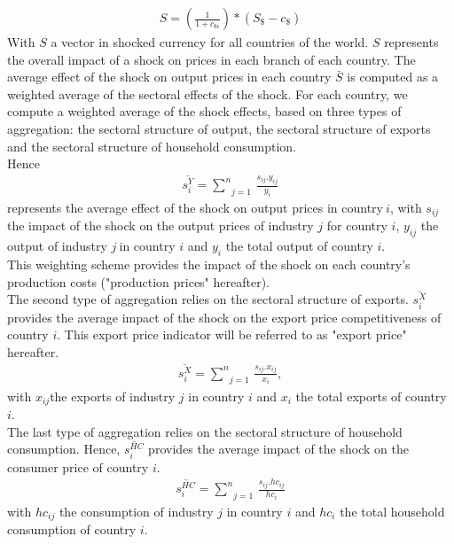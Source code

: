 \documentclass[11pt,a4paper]{article}
\begin{document}
\begin{eqnarray*}
	S=\left( \frac{1}{1+{{c}_{\$i}}}\right)*\left({{S}_{\$}}-{{c}_{\$}}\right)
\end{eqnarray*}
With $S$ a vector in shocked currency for all countries of the world. $S$ represents the overall impact of a shock on prices in each branch of each country. The average effect of the shock on output prices in each country $\bar{S}$ is computed as a weighted average of the sectoral effects of the shock. For each country, we compute a weighted average of the shock effects, based on three types of aggregation: the sectoral structure of output, the sectoral structure of exports and the sectoral structure of household consumption.\\
Hence 
\begin{eqnarray*}
\overline{s_{i}^{Y}}=\underset{j=1}{\overset{n}{\mathop \sum }}\,\frac{{{s}_{ij}}.{{y}_{ij}}}{{{y}_{i}}}
 \end{eqnarray*}
represents the average effect of the shock on output prices in country$~i$, with ${{{s}}_{{ij}}}$ the impact of the shock on the output prices of industry $j$ for country $i$, ${{{y}}_{{ij}}}$ the output of industry $j~$in country $i$ and ${{{y}}_{{i}}}$ the total output of country $i$. \\
This weighting scheme provides the impact of the shock on each country's production costs ("production prices" hereafter).\\
The second type of aggregation relies on the sectoral structure of exports. $\overline{s_{i}^{X}}$ provides the average impact of the shock on the export price competitiveness of country $i$. This export price indicator will be referred to as "export price" hereafter. \\
 \begin{eqnarray*}
\overline{s_{i}^{X}}=\underset{j=1}{\overset{n}{\mathop \sum }}\,\frac{{{s}_{ij}}.{{x}_{ij}}}{{{x}_{i}}},
 \end{eqnarray*} 
with $x_{ij}$the exports of industry $j$ in country $i$ and $x_{i}$ the total exports of country $i$. \\
The last type of aggregation relies on the sectoral structure of household consumption. Hence, $\overline{s_{i}^{HC}}$ provides the average impact of the shock on the consumer price of country $i$. 
 \begin{eqnarray}
\overline{s_{i}^{HC}}=\underset{j=1}{\overset{n}{\mathop \sum }}\,\frac{{{s}_{ij}}.h{{c}_{ij}}}{h{{c}_{i}}}
\label{eq:eq6}
 \end{eqnarray} 
with $hc_{ij}$ the consumption of industry $j$ in country $i$ and ${h}{{{c}}_{{i}}}$ the total household consumption of country $i$. 
\end{document}
